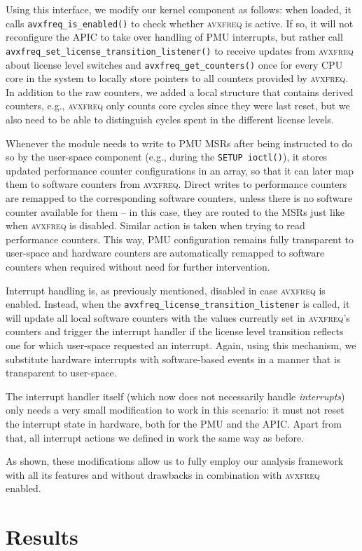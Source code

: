 Using this interface, we modify our kernel component as follows: when loaded, it calls \texttt{avxfreq\_is\_enabled()} to check whether \textsc{avxfreq} is active. If so, it will not reconfigure the \gls{APIC} to take over handling of \gls{PMU} interrupts, but rather call \texttt{avxfreq\_set\_license\_transition\_listener()} to receive updates from \textsc{avxfreq} about license level switches and \texttt{avxfreq\_get\_counters()} once for every \gls{CPU} core in the system to locally store pointers to all counters provided by \textsc{avxfreq}. In addition to the raw counters, we added a local structure that contains derived counters, e.g., \textsc{avxfreq} only counts core cycles since they were last reset, but we also need to be able to distinguish cycles spent in the different license levels.

Whenever the module needs to write to \gls{PMU} \glspl{MSR} after being instructed to do so by the user-space component (e.g., during the \texttt{SETUP ioctl()}), it stores updated performance counter configurations in an array, so that it can later map them to software counters from \textsc{avxfreq}. Direct writes to performance counters are remapped to the corresponding software counters, unless there is no software counter available for them -- in this case, they are routed to the \glspl{MSR} just like when \textsc{avxfreq} is disabled. Similar action is taken when trying to read performance counters. This way, \gls{PMU} configuration remains fully transparent to user-space and hardware counters are automatically remapped to software counters when required without need for further intervention.

Interrupt handling is, as previously mentioned, disabled in case \textsc{avxfreq} is enabled. Instead, when the \texttt{avxfreq\_license\_transition\_listener} is called, it will update all local software counters with the values currently set in \textsc{avxfreq}'s counters and trigger the interrupt handler if the license level transition reflects one for which user-space requested an interrupt. Again, using this mechanism, we substitute hardware interrupts with software-based events in a manner that is transparent to user-space.

The interrupt handler itself (which now does not necessarily handle \emph{interrupts}) only needs a very small modification to work in this scenario: it must not reset the interrupt state in hardware, both for the \gls{PMU} and the \gls{APIC}. Apart from that, all interrupt actions we defined in  work the same way as before.

As shown, these modifications allow us to fully employ our analysis framework with all its features and without drawbacks in combination with \textsc{avxfreq} enabled.

\section{Results}
\label{sec:evaluation:results}
